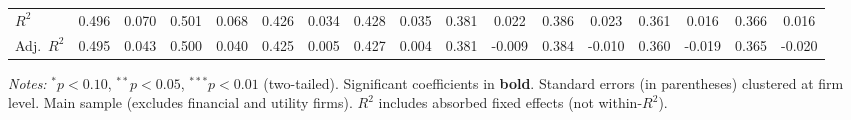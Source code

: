 \begin{landscape}
\begin{table}[H]
\begin{tabular}{lcccccccccccccccc}
$R^2$ & 0.496 & 0.070 & 0.501 & 0.068 & 0.426 & 0.034 & 0.428 & 0.035 & 0.381 & 0.022 & 0.386 & 0.023 & 0.361 & 0.016 & 0.366 & 0.016 \\
Adj.~$R^2$ & 0.495 & 0.043 & 0.500 & 0.040 & 0.425 & 0.005 & 0.427 & 0.004 & 0.381 & -0.009 & 0.384 & -0.010 & 0.360 & -0.019 & 0.365 & -0.020 \\
\bottomrule
\end{tabular}
\begin{minipage}{\linewidth}
\vspace{2pt}\scriptsize
\textit{Notes:} $^{*}p<0.10$, $^{**}p<0.05$, $^{***}p<0.01$ (two-tailed).
 Significant coefficients in \textbf{bold}.
 Standard errors (in parentheses) clustered at firm level.
 Main sample (excludes financial and utility firms).
 $R^2$ includes absorbed fixed effects (not within-$R^2$).
\end{minipage}
\end{table}
\end{landscape}